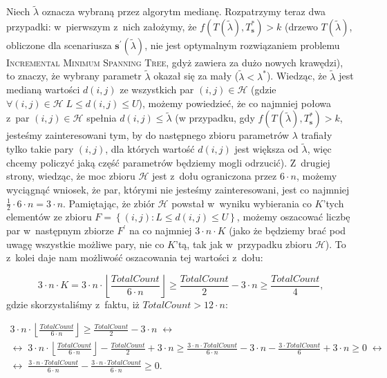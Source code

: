 Niech $\tilde{\lambda}$ oznacza wybraną przez algorytm medianę. Rozpatrzymy teraz dwa przypadki: w~pierwszym z~nich założymy, że $f \left( T \left( \tilde{\lambda} \right), T^{\ast}_{\textbf{s}} \right) > k$ (drzewo $T \left( \tilde{\lambda} \right)$, obliczone dla scenariusza $\textbf{s}^{\prime} \left( \tilde{\lambda} \right)$, nie jest optymalnym rozwiązaniem problemu \textsc{Incremental Minimum Spanning Tree}, gdyż zawiera za dużo nowych krawędzi), to znaczy, że wybrany parametr $\tilde{\lambda}$ okazał się za mały ($\tilde{\lambda} < \lambda^{\ast}$). Wiedząc, że $\tilde{\lambda}$ jest medianą wartości $d \left( i, j \right)$ ze wszystkich par $\left( i, j \right) \in \mathcal{H}$ (gdzie $\forall \left( i, j \right) \in \mathcal{H} \; L \leqslant d \left( i, j \right) \leqslant U$), możemy powiedzieć, że co najmniej połowa z~par $\left( i, j \right) \in \mathcal{H}$ spełnia $d \left( i, j \right) \leqslant \tilde{\lambda}$ (w przypadku, gdy $f \left( T \left( \tilde{\lambda} \right), T^{\ast}_{\textbf{s}} \right) > k$, jesteśmy zainteresowani tym, by do następnego zbioru parametrów $\lambda$ trafiały tylko takie pary $\left( i, j \right)$, dla których wartość $d \left( i, j \right)$ jest większa od $\tilde{\lambda}$, więc chcemy policzyć jaką część parametrów będziemy mogli odrzucić). Z~drugiej strony, wiedząc, że moc zbioru $\mathcal{H}$ jest z~dołu ograniczona przez $6 \cdot n$, możemy wyciągnąć wniosek, że par, którymi nie jesteśmy zainteresowani, jest co najmniej $\frac{1}{2} \cdot 6 \cdot n = 3 \cdot n$. Pamiętając, że zbiór $\mathcal{H}$ powstał w~wyniku wybierania co $K$'tych elementów ze zbioru $F = \left\{ \left(i, j \right) : L \leqslant d \left( i, j \right) \leqslant U \right\}$, możemy oszacować liczbę par w~następnym zbiorze $F^{\prime}$ na co najmniej $3 \cdot n \cdot K$ (jako że będziemy brać pod uwagę wszystkie możliwe pary, nie co $K$'tą, tak jak w~przypadku zbioru $\mathcal{H}$). To z~kolei daje nam możliwość oszacowania tej wartości z~dołu:

\begin{equation}\label{eq:Hset1}
	3 \cdot n \cdot K = 3 \cdot n \cdot \left\lfloor \frac{TotalCount}{6 \cdot n} \right\rfloor \geqslant \frac{TotalCount}{2} - 3 \cdot n \geqslant \frac{TotalCount}{4}\text{,}
\end{equation}
gdzie skorzystaliśmy z~faktu, iż $TotalCount > 12 \cdot n$:

\begin{gather*}
	3 \cdot n \cdot \left\lfloor \frac{TotalCount}{6 \cdot n} \right\rfloor \geqslant \frac{TotalCount}{2} - 3 \cdot n \; \leftrightarrow \\
	\leftrightarrow \; 3 \cdot n \cdot \left\lfloor \frac{TotalCount}{6 \cdot n} \right\rfloor - \frac{TotalCount}{2} + 3 \cdot n \geqslant \frac{3 \cdot n \cdot TotalCount}{6 \cdot n} - 3 \cdot n - \frac{3 \cdot TotalCount}{6} + 3 \cdot n \geqslant 0 \; \leftrightarrow \\
	\leftrightarrow \; \frac{3 \cdot n \cdot TotalCount}{6 \cdot n} -  \frac{3 \cdot n \cdot TotalCount}{6 \cdot n} \geqslant 0\text{.}
\end{gather*}

